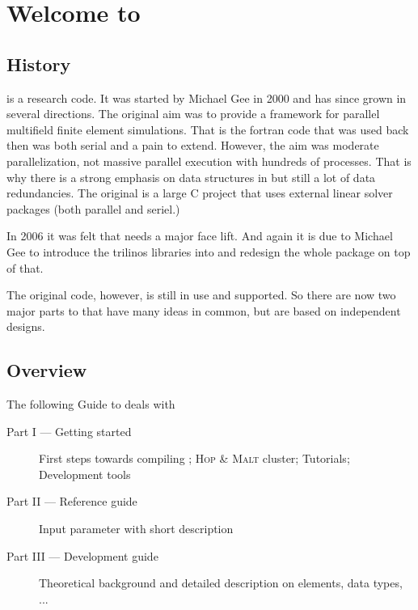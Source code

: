 \chapter{Welcome to \ccarat{}}

\section{History}

\ccarat{} is a research code. It was started by Michael Gee in 2000
and has since grown in several directions. The original aim was to
provide a framework for parallel multifield finite element simulations.
That is the fortran code that was used back then was both serial and
a pain to extend. However, the aim was moderate parallelization, not
massive parallel execution with hundreds of processes. That is why
there is a strong emphasis on data structures in \ccarat{} but still
a lot of data redundancies. The original \ccarat{} is a large C project
that uses external linear solver packages (both parallel and seriel.)

In 2006 it was felt that \ccarat{} needs a major face lift. And again
it is due to Michael Gee to introduce the trilinos libraries into
\ccarat{} and redesign the whole package on top of that.

The original code, however, is still in use and supported. So there
are now two major parts to \ccarat{} that have many ideas in common,
but are based on independent designs. 

\section{Overview}

The following Guide to \ccarat{} deals with

\begin{description}
\item[Part I --- Getting started] First steps towards compiling \ccarat{}; \textsc{Hop
  \& Malt} cluster; Tutorials;
  Development tools 
\item[Part II --- Reference guide] Input parameter with short description
\item[Part III --- Development guide] Theoretical background and detailed
  description   on elements, data types, ...
\end{description}
